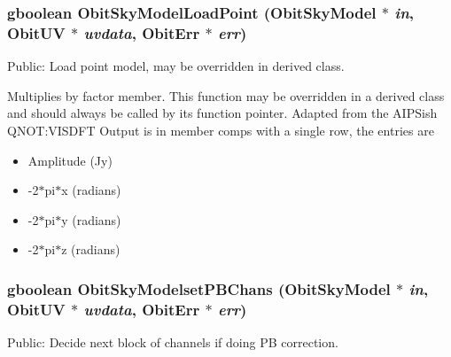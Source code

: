\subsubsection{\setlength{\rightskip}{0pt plus 5cm}gboolean Obit\-Sky\-Model\-Load\-Point ({\bf Obit\-Sky\-Model} $\ast$ {\em in}, {\bf Obit\-UV} $\ast$ {\em uvdata}, {\bf Obit\-Err} $\ast$ {\em err})}\label{ObitSkyModel_8h_a61}


Public: Load point model, may be overridden in derived class. 

Multiplies by factor member. This function may be overridden in a derived class and should always be called by its function pointer. Adapted from the AIPSish QNOT:VISDFT Output is in member comps with a single row, the entries are \begin{itemize}
\item Amplitude (Jy) \item -2$\ast$pi$\ast$x (radians) \item -2$\ast$pi$\ast$y (radians) \item -2$\ast$pi$\ast$z (radians) 
\end{itemize}
\subsubsection{\setlength{\rightskip}{0pt plus 5cm}gboolean Obit\-Sky\-Modelset\-PBChans ({\bf Obit\-Sky\-Model} $\ast$ {\em in}, {\bf Obit\-UV} $\ast$ {\em uvdata}, {\bf Obit\-Err} $\ast$ {\em err})}\label{ObitSkyModel_8h_a72}


Public: Decide next block of channels if doing PB correction. 

